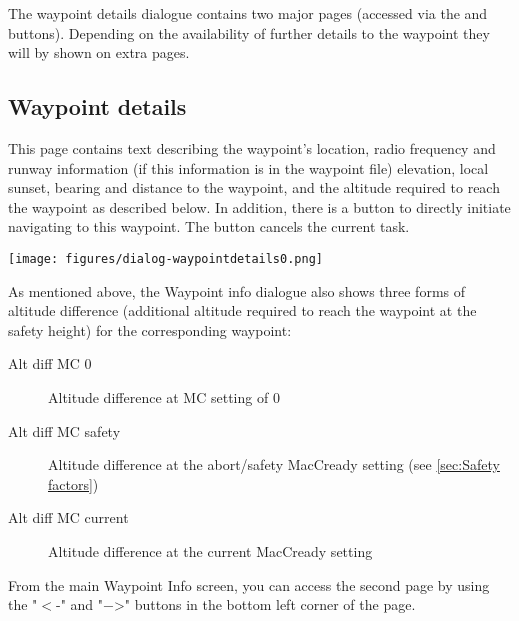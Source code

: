 The waypoint details dialogue contains two major pages (accessed via the
\button{$>$} and \button{$<$} buttons). Depending on the availability of further
details to the waypoint they will by shown on extra pages.

\subsection*{Waypoint details}\label{sec:waypointdetails}
This page contains text describing the waypoint's location, radio frequency and 
runway information (if this information is in the waypoint file) elevation, 
local sunset, bearing and distance to the waypoint, and the altitude required 
to reach the waypoint as described below. In addition, there is a button 
 to directly initiate
navigating to this waypoint. The button cancels the current task. 
\begin{center}
\texttt{[image: figures/dialog-waypointdetails0.png]}
\end{center}

As mentioned above, the Waypoint info dialogue also shows three forms of altitude 
difference (additional
altitude required to reach the waypoint at the safety height) for
the corresponding waypoint:
\begin{description}
\item[Alt diff MC 0] Altitude difference at MC setting of 0
\item[Alt diff MC safety] Altitude difference at the abort/safety MacCready 
  setting (see \ref{sec:Safety factors})
\item[Alt diff MC current] Altitude difference at the current MacCready setting
\end{description}

From the main Waypoint Info screen, you can access the second page by using the 
"$<$-" and "$-$>" buttons in the bottom left corner of the page.
